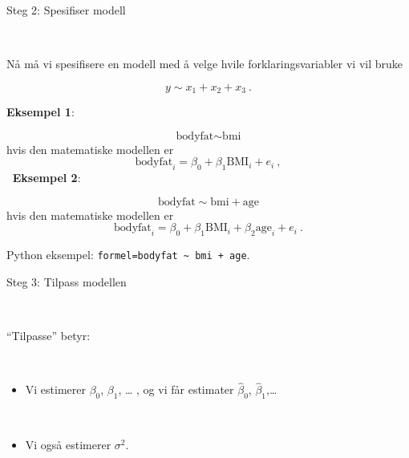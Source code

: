 \documentclass[10pt,ignorenonframetext,]{beamer}
\providecommand{\tightlist}{%
  \setlength{\itemsep}{0pt}\setlength{\parskip}{0pt}}
\begin{document}
\begin{frame}[fragile]

\begin{block}{Steg 2: Spesifiser modell}

\(~\)

Nå må vi spesifisere en modell med å velge hvile forklaringsvariabler vi
vil bruke

\[ y \sim x_1 + x_2 + x_3 \ .\]

\vspace{2mm}

\textbf{Eksempel 1}:

\[\text{bodyfat} \sim \text{bmi} \] hvis den matematiske modellen er
\[\text{bodyfat}_i = \beta_0 + \beta_1 \text{BMI}_i + e_i \ , \] \(~\)
\textbf{Eksempel 2}:

\[\text{bodyfat} \sim \text{bmi} + \text{age}\] hvis den matematiske
modellen er
\[\text{bodyfat}_i = \beta_0 + \beta_1 \text{BMI}_i + \beta_2 \text{age}_i + e_i \ . \]

Python eksempel:
\texttt{formel=\textquotesingle{}bodyfat\ \textasciitilde{}\ bmi\ +\ age\textquotesingle{}}.

\end{block}

\end{frame}

\begin{frame}

\begin{block}{Steg 3: Tilpass modellen}

\(~\)

``Tilpasse'' betyr:

\(~\)

\begin{itemize}
\tightlist
\item
  Vi estimerer \(\beta_0\), \(\beta_1\), \ldots{} , og vi får estimater
  \(\hat\beta_0\), \(\hat\beta_1\),\ldots{}
\end{itemize}

\(~\)

\begin{itemize}
\tightlist
\item
  Vi også estimerer \(\sigma^2\).
\end{itemize}

\end{block}

\end{frame}
\end{document}
